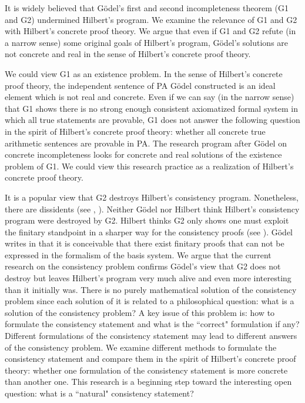 \documentclass[bsl,meeting]{asl}
\newcommand{\NP}{}
\begin{document}
\thispagestyle{empty}


\NP
{}

It is widely believed that G\"{o}del's first and second incompleteness theorem ({\sf G1} and
{\sf G2}) undermined Hilbert's program. We examine the relevance of {\sf G1} and {\sf G2} with
Hilbert's concrete proof theory. We argue that even if {\sf G1} and {\sf G2} refute (in a narrow
sense) some original goals of Hilbert's program, G\"{o}del's solutions are not concrete and real in the sense of Hilbert's concrete proof theory. 

We could view {\sf G1} as an existence problem. In the sense of Hilbert's concrete proof
theory, the independent sentence of {\sf PA}  G\"{o}del constructed is an ideal element which is not real and concrete. Even if we can say (in the narrow sense) that {\sf G1} shows there is no strong enough consistent axiomatized formal system in which all true statements are provable, {\sf G1} does not answer the following question in the spirit of Hilbert's concrete proof theory: whether all concrete true arithmetic sentences are provable in {\sf PA}. The research program after G\"{o}del on concrete incompleteness looks for concrete and real solutions of the existence problem of {\sf G1}. We could view this research practice as a realization of Hilbert's concrete proof theory.

It is a popular view that {\sf G2} destroys Hilbert's consistency program. Nonetheless,
there are dissidents (see \cite{Detlefsen}, \cite{Artemov}). Neither G\"{o}del nor Hilbert think Hilbert's consistency program were destroyed by {\sf G2}. Hilbert thinks {\sf G2} only shows one must exploit the finitary standpoint in a sharper way for the consistency proofs (see \cite{Hilbert}). G\"{o}del writes in \cite{Godel} that it is conceivable that there exist finitary proofs that can not be expressed in the
formalism of the basis system. We argue that the current research on the consistency
problem confirms G\"{o}del's view that {\sf G2} does not destroy but leaves Hilbert's program very much alive and even more interesting than it initially was. There is no purely
mathematical solution of the consistency problem since each solution of it is related
to a philosophical question: what is a solution of the consistency problem? A key
issue of this problem is: how to formulate the consistency statement and what is the
``correct" formulation if any? Different formulations of the consistency statement may
lead to different answers of the consistency problem. We examine different methods
to formulate the consistency statement and compare them in the spirit of Hilbert's
concrete proof theory: whether one formulation of the consistency statement is more
concrete than another one. This research is a beginning step toward the interesting
open question: what is a ``natural" consistency statement?
\end{document}
